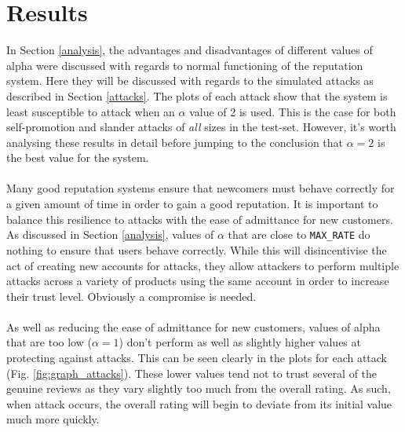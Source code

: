 \documentclass{article}
\begin{document}
\section{Results} %
In Section \ref{analysis}, the advantages and disadvantages of different values of alpha were discussed with regards to normal functioning of the reputation system. Here they will be discussed with regards to the simulated attacks as described in Section \ref{attacks}.
The plots of each attack show that the system is least susceptible to attack when an $\alpha$ value of 2 is used.
This is the case for both self-promotion and slander attacks of \textit{all} sizes in the test-set.
However, it's worth analysing these results in detail before jumping to the conclusion that $\alpha = 2$ is the best value for the system.
\\\\
Many good reputation systems ensure that newcomers must behave correctly for a given amount of time in order to gain a good reputation. It is important to balance this resilience to attacks with the ease of admittance for new customers.\cite{attack_defense} As discussed in Section \ref{analysis}, values of $\alpha$ that are close to \texttt{MAX\_RATE} do nothing to ensure that users behave correctly. While this will disincentivise the act of creating new accounts for attacks, they allow attackers to perform multiple attacks across a variety of products using the same account in order to increase their trust level. Obviously a compromise is needed.
\\\\
As well as reducing the ease of admittance for new customers, values of alpha that are too low ($\alpha = 1$) don't perform as well as slightly higher values at protecting against attacks. This can be seen clearly in the plots for each attack (Fig. \ref{fig:graph_attacks}).
These lower values tend not to trust several of the genuine reviews as they vary slightly too much from the overall rating.
As such, when attack occurs, the overall rating will begin to deviate from its initial value much more quickly.
\end{document}
